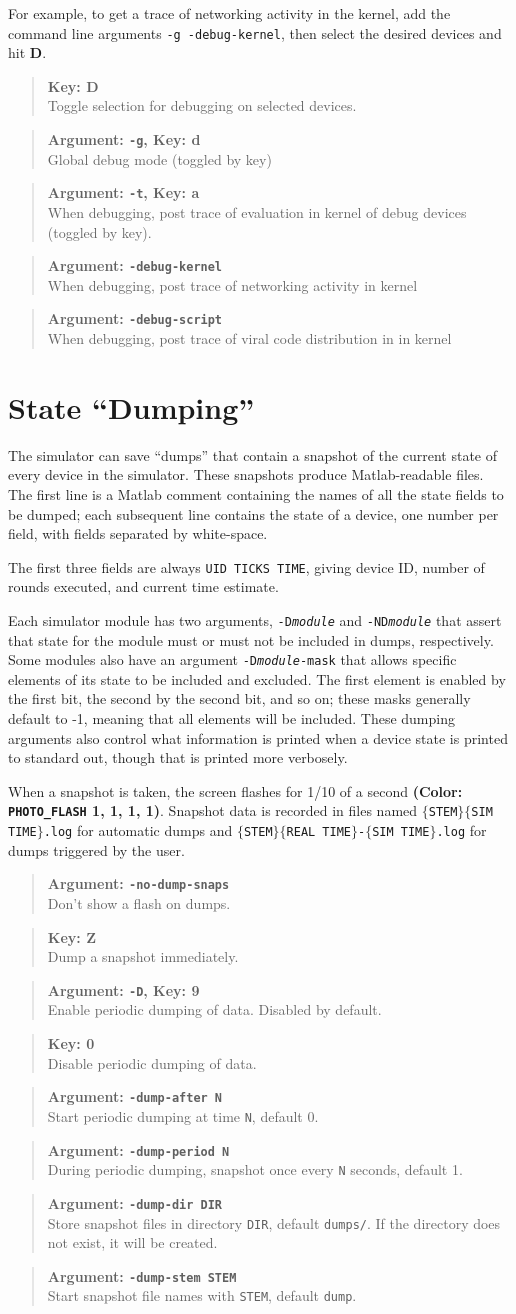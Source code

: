 \documentclass{article}
\newcommand\var[1]{{\tt #1}}
\newcommand\key[1]{{\bf #1}}
\newcommand\simarg[2]{\begin{quote} {\bf Argument: \var{#1}} \\ #2 \end{quote}}
\newcommand\simkey[2]{\begin{quote} {\bf Key: \key{#1}} \\ #2 \end{quote}}
\newcommand\simargkey[3]{
  \begin{quote} {\bf Argument: \var{#1}, Key: \key{#2}} \\ #3 \end{quote}
}
\newcommand\color[5]{{\bf (Color: {\tt #1} #2, #3, #4, #5)}} %
\begin{document}
For example, to get a trace of networking activity in the kernel, add
the command line arguments \var{-g -debug-kernel}, then select the
desired devices and hit \key{D}.

\simkey{D}{Toggle selection for debugging on selected devices.}
\simargkey{-g}{d}{Global debug mode (toggled by key)}
\simargkey{-t}{a}{When debugging, post trace of evaluation in kernel
  of debug devices (toggled by key).}
\simarg{-debug-kernel}{When debugging, post trace of networking
  activity in kernel}
\simarg{-debug-script}{When debugging, post trace of viral code
  distribution in in kernel}


\section{State ``Dumping''}

The simulator can save ``dumps'' that contain a snapshot of the
current state of every device in the simulator.  These snapshots
produce Matlab-readable files.  The first line is a Matlab comment
containing the names of all the state fields to be dumped; each
subsequent line contains the state of a device, one number per field,
with fields separated by white-space.

The first three fields are always \var{UID TICKS TIME}, giving device
ID, number of rounds executed, and current time estimate.

Each simulator module has two arguments, \var{-D{\em module}} and
\var{-ND{\em module}} that assert that state for the module must or
must not be included in dumps, respectively.  Some modules also have an
argument \var{-D{\em module}-mask} that allows specific elements of
its state to be included and excluded.  The first element is enabled
by the first bit, the second by the second bit, and so on; these masks
generally default to -1, meaning that all elements will be included.
These dumping arguments also control what information is printed when
a device state is printed to standard out, though that is printed more
verbosely.

When a snapshot is taken, the screen flashes for 1/10 of a second
\color{PHOTO\_FLASH}{1}{1}{1}{1}.  Snapshot data is recorded in files
named \var{$\{$STEM$\}\{$SIM TIME$\}$.log} for automatic dumps and
\var{$\{$STEM$\}\{$REAL TIME$\}$-$\{$SIM TIME$\}$.log} for dumps triggered by
the user.


\simarg{-no-dump-snaps}{Don't show a flash on dumps.}
\simkey{Z}{Dump a snapshot immediately.}
\simargkey{-D}{9}{Enable periodic dumping of data.  Disabled by default.}
\simkey{0}{Disable periodic dumping of data.}
\simarg{-dump-after N}{Start periodic dumping at time \var{N}, default 0.}
\simarg{-dump-period N}{During periodic dumping, snapshot once every \var{N}
  seconds, default 1.}
\simarg{-dump-dir DIR}{Store snapshot files in directory \var{DIR}, default
  \var{dumps/}.  If the directory does not exist, it will be created.}
\simarg{-dump-stem STEM}{Start snapshot file names with \var{STEM}, default
  \var{dump}.}
\end{document}
